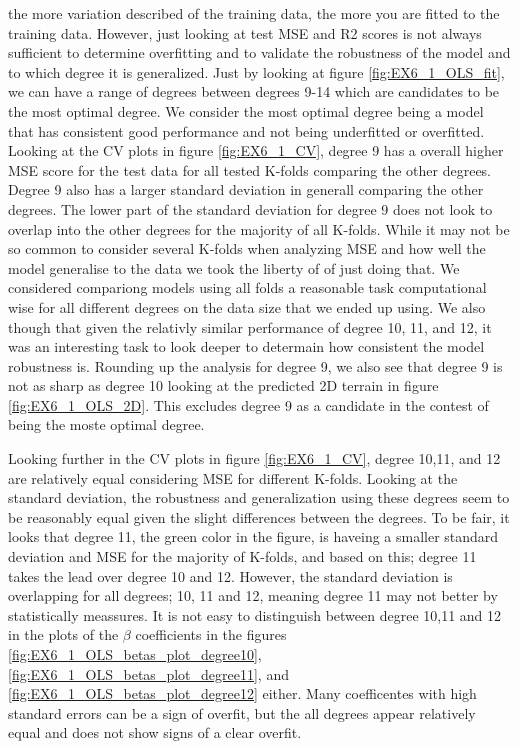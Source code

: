 \documentclass[11pt, a4paper]{article}
\begin{document}
the more variation described of the training data, the more you are fitted to the training data. However, just looking at test MSE and R2 scores is not always sufficient
to determine overfitting and to validate the robustness of the model and to which degree it is generalized. Just by looking at figure \ref{fig:EX6_1_OLS_fit}, we can have a range of degrees 
between degrees 9-14 which are candidates to be the most optimal degree. We consider the most optimal degree being a model that has consistent good performance and not being underfitted or overfitted. 
Looking at the CV plots in figure \ref{fig:EX6_1_CV}, degree 9 has a overall higher MSE score for the test data for all tested K-folds comparing the other degrees. Degree 9 also has a larger standard deviation 
in generall comparing the other degrees. The lower part of the standard deviation for degree 9 does not look to overlap into the other degrees for the majority of all K-folds. While it may not be so common 
to consider several K-folds when analyzing MSE and how well the model generalise to the data we took the liberty of of just doing that. We considered compariong models using all folds a reasonable task 
computational wise for all different degrees on the data size that we ended up using. We also though that given the relativly similar performance of degree 10, 11, and 12, it was an interesting task to 
look deeper to determain how consistent the model robustness is. Rounding up the analysis for degree 9, we also see that degree 9 is not as sharp as degree 10 looking at the predicted 2D terrain in figure \ref{fig:EX6_1_OLS_2D}. 
This excludes degree 9 as a candidate in the contest of being the moste optimal degree. 

Looking further in the CV plots in figure \ref{fig:EX6_1_CV}, degree 10,11, and 12 are relatively equal considering MSE for different K-folds. Looking at the standard deviation,
the robustness and generalization using these degrees seem to be reasonably equal given the slight differences between the degrees. To be fair, it looks that degree 11, the green color in the figure,
is haveing a smaller standard deviation and MSE for the majority of K-folds, and based on this; degree 11 takes the lead over degree 10 and 12. However, the standard deviation is overlapping for all 
degrees; 10, 11 and 12, meaning degree 11 may not better by statistically meassures. It is not easy to distinguish between degree 10,11 and 12 in the 
plots of the $\beta$ coefficients in the figures \ref{fig:EX6_1_OLS_betas_plot_degree10}, \ref{fig:EX6_1_OLS_betas_plot_degree11}, and \ref{fig:EX6_1_OLS_betas_plot_degree12} either. 
Many coefficentes with high standard errors can be a sign of overfit, but the all degrees appear relatively equal and does not show signs of a clear overfit. 
\end{document}
